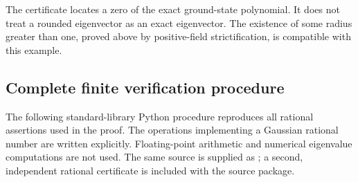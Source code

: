 \documentclass[reqno]{amsart}
\theoremstyle{definition}
\theoremstyle{remark}
\begin{document}
The certificate locates a zero of the exact ground-state polynomial.
It does not treat a rounded eigenvector as an exact eigenvector.
The existence of some radius greater than one, proved above by
positive-field strictification, is compatible with this example.

\subsection*{Complete finite verification procedure}
The following standard-library Python procedure reproduces all
rational assertions used in the proof. The operations implementing
a Gaussian rational number are written explicitly. Floating-point
arithmetic and numerical eigenvalue computations are not used.
The same source is supplied as
; a second,
independent rational certificate is included with the source package.
\end{document}
